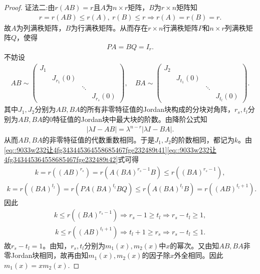 \documentclass[../../main.tex]{subfiles}%
\begin{document}
\begin{proof}
{\color{blue}证法二:}由$r(AB) = r$且$A$为$n \times r$矩阵，$B$为$r \times n$矩阵知
\begin{align*}
r = r(AB) \leqslant r(A),\ r(B) \leqslant r \Longrightarrow r(A) = r(B) = r.
\end{align*}
故$A$为列满秩矩阵，$B$为行满秩矩阵。从而存在$r \times n$行满秩矩阵$P$和$n \times r$列满秩矩阵$Q$，使得
\begin{align}
PA = BQ = I_r. \label{eq::9033w232让4fg343445364558685467fge232489t41}
\end{align}
不妨设
\begin{align}
AB \sim \begin{pmatrix}
J_1 & & & \\
& J_{r_1}(0) & & \\
& & \ddots & \\
& & & J_{r_s}(0)
\end{pmatrix},\quad BA \sim \begin{pmatrix}
J_2 & & & \\
& J_{t_1}(0) & & \\
& & \ddots & \\
& & & J_{t_l}(0)
\end{pmatrix}. \label{eq::9033w232让4fg343445364558685467fge232489t42}
\end{align}
其中$J_1,J_2$分别为$AB,BA$的所有非零特征值的Jordan块构成的分块对角阵，$r_s,t_l$分别为$AB,BA$的$0$特征值的Jordan块中最大块的阶数。由降阶公式知
\begin{align*}
\left| \lambda I - AB \right| = \lambda^{n - r} \left| \lambda I - BA \right|.
\end{align*}
从而$AB,BA$的非零特征值的代数重数相同。于是$J_1,J_2$的阶数相同，都记为$k$。由\eqref{eq::9033w232让4fg343445364558685467fge232489t41}\eqref{eq::9033w232让4fg343445364558685467fge232489t42}式可得
\begin{align*}
k = r\left( \left( AB \right)^{r_s} \right) = r\left( A\left( BA \right)^{r_s - 1}B \right) \leqslant r\left( \left( BA \right)^{r_s - 1} \right),
\end{align*}
\begin{align*}
k = r\left( \left( BA \right)^{t_l} \right) = r\left( PA\left( BA \right)^{t_l}BQ \right) \leqslant r\left( A\left( BA \right)^{t_l}B \right) = r\left( \left( AB \right)^{t_l + 1} \right).
\end{align*}
因此
\begin{align*}
k \leqslant r\left( \left( BA \right)^{r_s - 1} \right) \Longrightarrow r_s - 1 \geqslant t_l \Longrightarrow r_s - t_l \geqslant 1,
\end{align*}
\begin{align*}
k \leqslant r\left( \left( AB \right)^{t_l + 1} \right) \Longrightarrow t_l + 1 \geqslant r_s \Longrightarrow r_s - t_l \leqslant 1.
\end{align*}
故$r_s - t_l = 1$。由知，$r_s,t_l$分别为$m_1(x),m_2(x)$中$x$的幂次。又由知$AB,BA$非零Jordan块相同，故再由知$m_1(x),m_2(x)$的因子除$x$外全相同。因此$m_1(x) = xm_2(x)$.

\end{proof}
\end{document}
